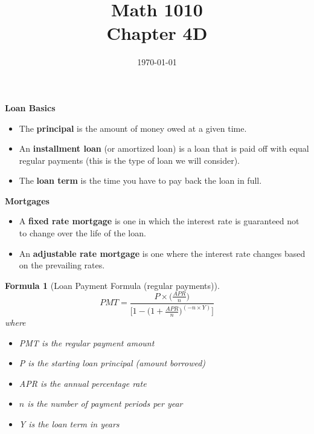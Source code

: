 \documentclass[12pt]{article}
\newtheorem{formula}[theorem]{Formula}
\begin{document}
\title{\bf Math 1010 \\ Chapter 4D\iftoggle{sol}{ Key}{} }
\date{\today}
\maketitle

{\large \bf Loan Basics}
\begin{itemize}
	\item The {\bf principal} is the amount of money owed at a given time.
	\item An {\bf installment loan} (or amortized loan) is a loan that is paid off with equal regular payments (this is the type of loan we will consider).
	\item The {\bf loan term} is the time you have to pay back the loan in full.
\end{itemize}

{\large \bf Mortgages}
\begin{itemize}
	\item A {\bf fixed rate mortgage} is one in which the interest rate is guaranteed not to change over the life of the loan.
	\item An {\bf adjustable rate mortgage} is one where the interest rate changes based on the prevailing rates.
\end{itemize}

\begin{formula}[Loan Payment Formula (regular payments)]
\begin{equation}\label{eq:loan_formula}
	PMT = \frac{P\times \Big(\frac{APR}{n} \Big)}{\Big[1 - \Big(1 + \frac{APR}{n}\Big)^{(-n\times Y)}\Big]}
\end{equation}
where
\begin{itemize}
	\item PMT is the regular payment amount
	\item P is the starting loan principal (amount borrowed)
	\item APR is the annual percentage rate
	\item $n$ is the number of payment periods per year
	\item Y is the loan term in years
\end{itemize}

\end{formula}
\end{document}
